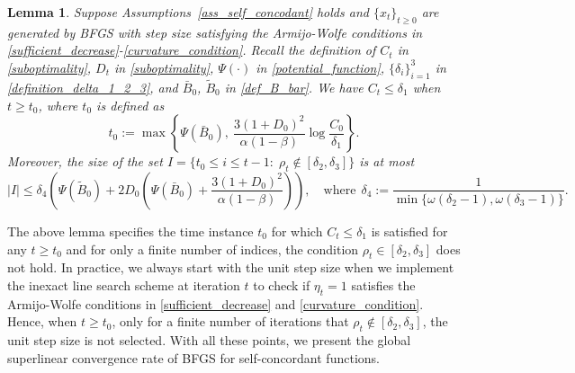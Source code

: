 \documentclass[11pt,letterpaper]{article}
\newcommand\0{{\Vector{0}}}
\newcommand\1{{\Vector{1}}}
\newtheorem{lemma}[theorem]{Lemma}
\numberwithin{assumption}{section}
\numberwithin{definition}{section}
\numberwithin{theorem}{section}
\numberwithin{remark}{section}
\begin{document}
\begin{lemma}\label{lem:bad_set}
    Suppose Assumptions~\ref{ass_self_concodant} holds and  $\{x_t\}_{t \geq 0}$ are generated by BFGS with step size satisfying the Armijo-Wolfe conditions in \eqref{sufficient_decrease}-\eqref{curvature_condition}. Recall the definition of $C_t$ in \eqref{suboptimality}, $D_t$ in \eqref{suboptimality}, $\Psi(\cdot)$ in \eqref{potential_function}, $\{\delta_i\}_{i = 1}^{3}$ in \eqref{definition_delta_1_2_3}, and $\bar{B}_0$, $\tilde{B}_0$ in \eqref{def_B_bar}. We have $C_t \leq \delta_1$ when $t \geq t_0$, where $t_0$ is defined as
    \begin{equation}\label{definition_t_0}
        t_0 := \max\left\{\Psi(\bar{B}_0), \ \frac{3(1 + D_0)^2}{\alpha(1 - \beta)}\log{\frac{C_0}{\delta_1}}\right\}.
    \end{equation}
    Moreover, the size of the set $I = \{t_0 \leq i \leq t - 1:\; \rho_t \notin [\delta_2,\delta_3]\}$ is at most 
    \begin{equation}\label{definition_delta_4}
        |I| \leq \delta_4\left(\Psi(\tilde{B}_{0}) + 2D_0\left(\Psi(\bar{B}_{0}) + \frac{3(1 + D_0)^2}{\alpha(1 - \beta)}\right)\right),\quad \!\!\text{where}\ \ \delta_4 := \frac{1}{\min\{\omega(\delta_2 - 1), \omega(\delta_3 - 1)\}}.
    \end{equation}
\end{lemma}

The above lemma specifies the time instance $t_0$ for which $C_t \leq \delta_1$ is satisfied for any $t \geq t_0$ and for only a finite number of indices, the condition $\rho_t \in [\delta_2, \delta_3]$ does not hold. In practice, we always start with the unit step size when we implement the inexact line search scheme at iteration $t$ to check if $\eta_t = 1$ satisfies the Armijo-Wolfe conditions in \eqref{sufficient_decrease} and \eqref{curvature_condition}. Hence, when $t \geq t_0$, only for a finite number of iterations that $\rho_t \notin [\delta_2, \delta_3]$, the unit step size is not selected. With all these points, we present the global superlinear convergence rate of BFGS for self-concordant functions. %
\end{document}
